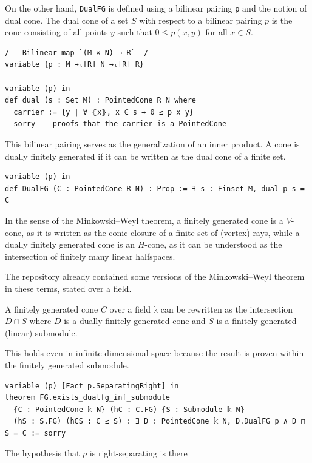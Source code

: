 On the other hand, \texttt{DualFG} is defined using a bilinear pairing \texttt{p}
and the notion of dual cone.
The dual cone of a set $S$ with respect to a bilinear pairing $p$ is the cone
consisting of all points $y$ such that $0 \leq p(x, y)$ for all $x \in S$.

\begin{lstlisting}
/-- Bilinear map `(M × N) → R` -/
variable {p : M →ₗ[R] N →ₗ[R] R}

variable (p) in
def dual (s : Set M) : PointedCone R N where
  carrier := {y | ∀ ⦃x⦄, x ∈ s → 0 ≤ p x y}
  sorry -- proofs that the carrier is a PointedCone
\end{lstlisting}

This bilinear pairing serves as the generalization of an inner product.
A cone is dually finitely generated if it can be written as the dual cone of a finite set.

\begin{lstlisting}
variable (p) in
def DualFG (C : PointedCone R N) : Prop := ∃ s : Finset M, dual p s = C
\end{lstlisting}

In the sense of the Minkowski--Weyl theorem, a finitely generated cone is
a $V$-cone, as it is written as the conic closure of a finite set of (vertex) rays,
while a dually finitely generated cone is an $H$-cone, as it can be understood
as the intersection of finitely many linear halfspaces.

The repository already contained some versions of the Minkowski--Weyl theorem
in these terms, stated over a field.

A finitely generated cone $C$ over a field $\mathbb{k}$ can be rewritten
as the intersection $D \cap S$ where $D$ is a dually finitely generated
cone and $S$ is a finitely generated (linear) submodule.

This holds even in infinite dimensional space because the result is proven
within the finitely generated submodule.
\begin{lstlisting}
variable (p) [Fact p.SeparatingRight] in
theorem FG.exists_dualfg_inf_submodule
  {C : PointedCone 𝕜 N} (hC : C.FG) {S : Submodule 𝕜 N}
  (hS : S.FG) (hCS : C ≤ S) : ∃ D : PointedCone 𝕜 N, D.DualFG p ∧ D ⊓ S = C := sorry
\end{lstlisting}

The hypothesis that $p$ is right-separating is there

